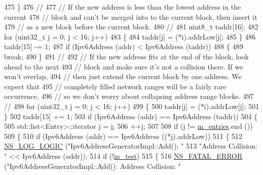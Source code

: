 \begin{DoxyCode}
475         \}
476       \textcolor{comment}{//}
477       \textcolor{comment}{// If the new address is less than the lowest address in the current}
478       \textcolor{comment}{// block and can't be merged into to the current block, then insert it}
479       \textcolor{comment}{// as a new block before the current block.}
480       \textcolor{comment}{//}
481       uint8\_t taddr[16];
482       \textcolor{keywordflow}{for} (uint32\_t j = 0; j < 16; j++)
483         \{
484           taddr[j] = (*i).addrLow[j];
485         \}
486       taddr[15] -= 1;
487       \textcolor{keywordflow}{if} (Ipv6Address (addr) < Ipv6Address (taddr))
488         \{
489           \textcolor{keywordflow}{break};
490         \}
491       \textcolor{comment}{//}
492       \textcolor{comment}{// If the new address fits at the end of the block, look ahead to the next}
493       \textcolor{comment}{// block and make sure it's not a collision there.  If we won't overlap,}
494       \textcolor{comment}{// then just extend the current block by one address.  We expect that}
495       \textcolor{comment}{// completely filled network ranges will be a fairly rare occurrence,}
496       \textcolor{comment}{// so we don't worry about collapsing address range blocks.}
497       \textcolor{comment}{//}
498       \textcolor{keywordflow}{for} (uint32\_t j = 0; j < 16; j++)
499         \{
500           taddr[j] = (*i).addrLow[j];
501         \}
502       taddr[15] += 1;
503       \textcolor{keywordflow}{if} (Ipv6Address (addr) == Ipv6Address (taddr))
504         \{
505           std::list<Entry>::iterator j = \hyperlink{bernuolliDistribution_8m_a6f6ccfcf58b31cb6412107d9d5281426}{i};
506           ++j;
507 
508           \textcolor{keywordflow}{if} (j != \hyperlink{classns3_1_1Ipv6AddressGeneratorImpl_ab7b8cc4871178edafc571d7a9449fef1}{m\_entries}.end ())
509             \{
510               \textcolor{keywordflow}{if} (Ipv6Address (addr) == Ipv6Address ((*j).addrLow))
511                 \{
512                   \hyperlink{group__logging_ga88acd260151caf2db9c0fc84997f45ce}{NS\_LOG\_LOGIC} (\textcolor{stringliteral}{"Ipv6AddressGeneratorImpl::Add(): "}
513                                 \textcolor{stringliteral}{"Address Collision: "} << Ipv6Address (addr));
514                   \textcolor{keywordflow}{if} (!\hyperlink{classns3_1_1Ipv6AddressGeneratorImpl_a6538e5a709f4060466c5253a0289cdf8}{m\_test})
515                     \{
516                       \hyperlink{group__fatal_ga5131d5e3f75d7d4cbfd706ac456fdc85}{NS\_FATAL\_ERROR} (\textcolor{stringliteral}{"Ipv6AddressGeneratorImpl::Add(): Address Collision: "} 

\end{DoxyCode}
